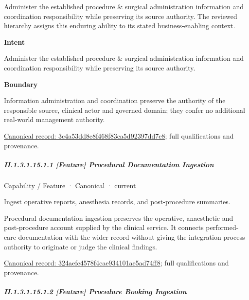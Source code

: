 Administer the established procedure \& surgical administration information and coordination responsibility while preserving its source authority. The reviewed hierarchy assigns this enduring ability to its stated business-enabling context.



\textbf{Intent}



Administer the established procedure \& surgical administration information and coordination responsibility while preserving its source authority.



\textbf{Boundary}



Information administration and coordination preserve the authority of the responsible source, clinical actor and governed domain; they confer no additional real-world management authority.


{\footnotesize \href{../../../../continuum/strategy/capability/3c4a53dd8c8f468f83ca5d92397dd7e8.md}{Canonical record: 3c4a53dd8c8f468f83ca5d92397dd7e8}; full qualifications and provenance.}\par
\subparagraph*{II.1.3.1.15.1.1 [Feature] Procedural Documentation Ingestion}
\label{navigation:II.1.3.1.15.1.1}

\label{element:324aefc4578f4cae934101ae5ad74ff8}
{\small Capability / Feature · Canonical · current}\par

Ingest operative reports, anesthesia records, and post-procedure summaries.



Procedural documentation ingestion preserves the operative, anaesthetic and post-procedure account supplied by the clinical service. It connects performed-care documentation with the wider record without giving the integration process authority to originate or judge the clinical findings.


{\footnotesize \href{../../../../continuum/strategy/capability/feature/324aefc4578f4cae934101ae5ad74ff8.md}{Canonical record: 324aefc4578f4cae934101ae5ad74ff8}; full qualifications and provenance.}\par
\subparagraph*{II.1.3.1.15.1.2 [Feature] Procedure Booking Ingestion}
\label{navigation:II.1.3.1.15.1.2}

